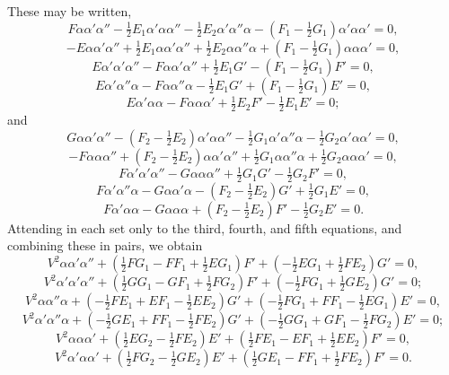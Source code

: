 \documentclass[11pt,a4paper]{article}
\begin{document}
These may be written,
\[
  F\alpha\alpha'\alpha''-\tfrac{1}{2}E_{1}\alpha'\alpha\alpha''-\tfrac{1}{2}E_{2}\alpha'\alpha''\alpha-(F_{1}-\tfrac{1}{2}G_{1})\alpha'\alpha\alpha'=0,
\]
\[
  -E\alpha\alpha'\alpha''+\tfrac{1}{2}E_{1}\alpha\alpha'\alpha''+\tfrac{1}{2}E_{2}\alpha\alpha''\alpha+(F_{1}-\tfrac{1}{2}G_{1})\alpha\alpha\alpha'=0,
\]
\[
  E\alpha'\alpha'\alpha''-F\alpha\alpha'\alpha''+\tfrac{1}{2}E_{1}G'-(F_{1}-\tfrac{1}{2}G_{1})F'=0,
\]
\[
  E\alpha'\alpha''\alpha-F\alpha\alpha''\alpha-\tfrac{1}{2}E_{1}G'+(F_{1}-\tfrac{1}{2}G_{1})E'=0,
\]
\[
  E\alpha'\alpha\alpha-F\alpha\alpha\alpha'+\tfrac{1}{2}E_{2}F'-\tfrac{1}{2}E_{1}E'=0;
\]
and
\[
  G\alpha\alpha'\alpha''-(F_{2}-\tfrac{1}{2}E_{2})\alpha'\alpha\alpha''-\tfrac{1}{2}G_{1}\alpha'\alpha''\alpha-\tfrac{1}{2}G_{2}\alpha'\alpha\alpha'=0,
\]
\[
  -F\alpha\alpha\alpha''+(F_{2}-\tfrac{1}{2}E_{2})\alpha\alpha'\alpha''+\tfrac{1}{2}G_{1}\alpha\alpha''\alpha+\tfrac{1}{2}G_{2}\alpha\alpha\alpha'=0,
\]
\[
  F\alpha'\alpha'\alpha''-G\alpha\alpha\alpha''+\tfrac{1}{2}G_{1}G'-\tfrac{1}{2}G_{2}F'=0,
\]
\[
  F\alpha'\alpha''\alpha-G\alpha\alpha'\alpha-(F_{2}-\tfrac{1}{2}E_{2})G'+\tfrac{1}{2}G_{1}E'=0,
\]
\[
  F\alpha'\alpha\alpha-G\alpha\alpha\alpha+(F_{2}-\tfrac{1}{2}E_{2})F'-\tfrac{1}{2}G_{2}E'=0.
\]
Attending in each set only to the third, fourth, and fifth equations,
and combining these in pairs, we obtain
\[
  V^{2}\alpha\alpha'\alpha''+(\tfrac{1}{2}FG_{1}-FF_{1}+\tfrac{1}{2}EG_{1})F'+(-\tfrac{1}{2}EG_{1}+\tfrac{1}{2}FE_{2})G'=0,
\]
\[
  V^{2}\alpha'\alpha'\alpha''+(\tfrac{1}{2}GG_{1}-GF_{1}+\tfrac{1}{2}FG_{2})F'+(-\tfrac{1}{2}FG_{1}+\tfrac{1}{2}GE_{2})G'=0;
\]
\[
  V^{2}\alpha\alpha''\alpha+(-\tfrac{1}{2}FE_{1}+EF_{1}-\tfrac{1}{2}EE_{2})G'+(-\tfrac{1}{2}FG_{1}+FF_{1}-\tfrac{1}{2}EG_{1})E'=0,
\]
\[
  V^{2}\alpha'\alpha''\alpha+(-\tfrac{1}{2}GE_{1}+FF_{1}-\tfrac{1}{2}FE_{2})G'+(-\tfrac{1}{2}GG_{1}+GF_{1}-\tfrac{1}{2}FG_{2})E'=0;
\]
\[
  V^{2}\alpha\alpha\alpha'+(\tfrac{1}{2}EG_{2}-\tfrac{1}{2}FE_{2})E'+(\tfrac{1}{2}FE_{1}-EF_{1}+\tfrac{1}{2}EE_{2})F'=0,
\]
\[
  V^{2}\alpha'\alpha\alpha'+(\tfrac{1}{2}FG_{2}-\tfrac{1}{2}GE_{2})E'+(\tfrac{1}{2}GE_{1}-FF_{1}+\tfrac{1}{2}FE_{2})F'=0.
\]
\end{document}
